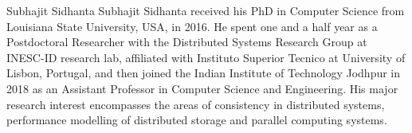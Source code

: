 \documentclass[journal, compsoc]{IEEEtran}
\begin{document}
	\begin{IEEEbiography}{Subhajit Sidhanta}
		Subhajit Sidhanta received his PhD in Computer Science from Louisiana State University, USA, in 2016. He spent one and a half year as a Postdoctoral Researcher with the Distributed Systems Research Group at INESC-ID research lab, affiliated with Instituto Superior Tecnico at University of Lisbon, Portugal, and then joined the Indian Institute of Technology Jodhpur in 2018 as an Assistant Professor in Computer Science and Engineering. His major research interest encompasses the areas of consistency in distributed systems, performance modelling of distributed storage and parallel computing systems.
	\end{IEEEbiography}
	
\end{document}

